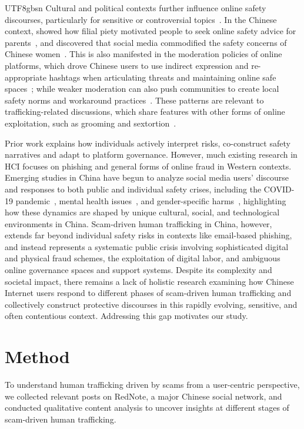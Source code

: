 \documentclass[sigconf,nonacm]{acmart}
\newcommand{\rev}[1]{#1}
\begin{document}
\begin{CJK}{UTF8}{gbsn}
\rev{Cultural and political contexts further influence online safety discourses,  particularly for sensitive or controversial topics~\cite{zhou-chi17, tam-chi23, deng-deng25}. In the Chinese context, \citeauthor{deng-deng25} showed how filial piety motivated people to seek online safety advice for parents~\cite{deng-deng25}, and \citeauthor{he2025living} discovered that social media commodified the safety concerns of Chinese women~\cite{he2025living}. This is also manifested in the moderation policies of online platforms, which drove Chinese users to use indirect expression and re-appropriate hashtags when articulating threats and maintaining online safe spaces~\cite{pater2016harassment, wu2021hidden, wan-chi25, mayworm2024content}; while weaker moderation can also push communities to create local safety norms and workaround practices~\cite{sabri2023challenges}. These patterns are relevant to trafficking-related discussions, which share features with other forms of online exploitation, such as grooming and sextortion~\cite{razi2023sliding}.}

\rev{Prior work explains how individuals actively interpret risks, co-construct safety narratives and adapt to platform governance. However, much existing research in HCI focuses on phishing and general forms of online fraud in Western contexts. Emerging studies in China have begun to analyze social media users' discourse and responses to both public and individual safety crises, including the COVID-19 pandemic~\cite{lu-cscw21}, mental health issues~\cite{zhang2018online}, and gender-specific harms~\cite{he2025living}, highlighting how these dynamics are shaped by unique cultural, social, and technological environments in China. Scam-driven human trafficking in China, however, extends far beyond individual safety risks in contexts like email-based phishing, and instead represents a systematic public crisis involving sophisticated digital and physical fraud schemes, the exploitation of digital labor, and ambiguous online governance spaces and support systems. Despite its complexity and societal impact, there remains a lack of holistic research examining how Chinese Internet users respond to different phases of scam-driven human trafficking and collectively construct protective discourses in this rapidly evolving, sensitive, and often contentious context. Addressing this gap motivates our study.}

\section{Method}
\label{sec:method}
To understand human trafficking driven by scams from a user-centric perspective, we collected relevant posts on RedNote, a major Chinese social network, and conducted qualitative content analysis to uncover insights at different stages of scam-driven human trafficking.


\end{CJK}
\end{document}

